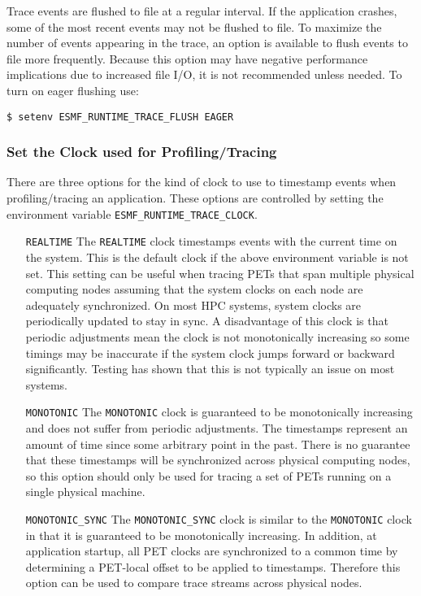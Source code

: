 Trace events are flushed to file at a regular interval. If the application
crashes, some of the most recent events may not be flushed to file. To
maximize the number of events appearing in the trace, an option is available
to flush events to file more frequently. Because this option may have
negative performance implications due to increased file I/O, it is not
recommended unless needed. To turn on eager flushing use:

\begin{verbatim}
$ setenv ESMF_RUNTIME_TRACE_FLUSH EAGER
\end{verbatim}

\subsubsection{Set the Clock used for Profiling/Tracing}
\label{sec:TracingClocks}

There are three options for the kind of clock to use to timestamp
events when profiling/tracing an application.
These options are controlled by setting the environment variable
{\tt ESMF\_RUNTIME\_TRACE\_CLOCK}.
\begin{itemize}
\item [{\tt REALTIME}] The {\tt REALTIME} clock timestamps events with the current time on
      the system.  This is the default clock if the above environment
      variable is not set.  This setting can be useful when tracing PETs that
      span multiple physical computing nodes assuming that the system clocks
      on each node are adequately synchronized.  On most HPC systems, system
      clocks are periodically updated to stay in sync.  A disadvantage of this
      clock is that periodic adjustments mean the clock is not monotonically
      increasing so some timings may be inaccurate if the system clock jumps
      forward or backward significantly. Testing has shown that this is not
      typically an issue on most systems.
\item [{\tt MONOTONIC}] The {\tt MONOTONIC} clock is guaranteed to be monotonically increasing
      and does not suffer from periodic adjustments.  The timestamps represent
      an amount of time since some arbitrary point in the past.  There is no
      guarantee that these timestamps will be synchronized across physical
      computing nodes, so this option should only be used for tracing a set of PETs
      running on a single physical machine.
\item [{\tt MONOTONIC\_SYNC}] The {\tt MONOTONIC\_SYNC} clock is similar to the {\tt MONOTONIC} clock
      in that it is guaranteed to be monotonically increasing. In addition, at
      application startup, all PET clocks are synchronized to a common time
      by determining a PET-local offset to be applied to timestamps. Therefore this option
      can be used to compare trace streams across physical nodes.
\end{itemize}
